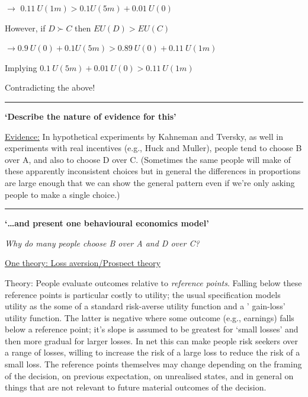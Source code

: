 \documentclass[]{article}
\begin{document}
\(\rightarrow\) \(0.11 \: U(1m) > 0.1 U(5m) + 0.01 \: U(0)\)

\medskip

\bigskip

However, if \(D \succ C\) then \(EU(D)>EU(C)\)

\(\rightarrow 0.9 \: U(0) + 0.1 U(5m) > 0.89 \: U(0) + 0.11 \: U(1m)\)

Implying \(0.1 \: U(5m) + 0.01 \: U(0) > 0.11 \: U(1m)\)

Contradicting the above!

\begin{center}\rule{0.5\linewidth}{\linethickness}\end{center}

\small

\textbf{`Describe the nature of evidence for this'}

\underline{Evidence:} In hypothetical experiments by Kahneman and
Tversky, as well in experiments with real incentives (e.g., Huck and
Muller), people tend to choose B over A, and also to choose D over C.
(Sometimes the same people will make of these apparently inconsistent
choices but in general the differences in proportions are large enough
that we can show the general pattern even if we're only asking people to
make a single choice.)

\begin{center}\rule{0.5\linewidth}{\linethickness}\end{center}

\textbf{`\ldots and present one behavioural economics model'}

\textit{Why do many people choose B over A and D over C?}

\bigskip

\underline{One theory: Loss aversion/Prospect theory}

\footnotesize

Theory: People evaluate outcomes relative to \textit{reference points}.
Falling below these reference points is particular costly to utility;
the usual specification models utility as the some of a standard
risk-averse utility function and a ' gain-loss' utility function. The
latter is negative where some outcome (e.g., earnings) falls below a
reference point; it's slope is assumed to be greatest for `small losses'
and then more gradual for larger losses. In net this can make people
risk seekers over a range of losses, willing to increase the risk of a
large loss to reduce the risk of a small loss. The reference points
themselves may change depending on the framing of the decision, on
previous expectation, on unrealised states, and in general on things
that are not relevant to future material outcomes of the decision.
\end{document}
